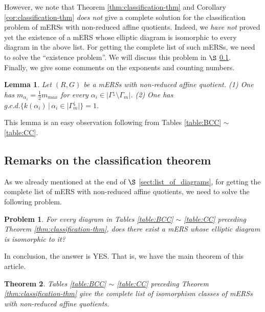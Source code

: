 \documentclass[11pt]{amsart}
\newtheorem{thm}{Theorem}[section]
\newtheorem{lemma}[thm]{Lemma}%
\newtheorem{prob}{Problem}
\begin{document}
{However, we note that Theorem \ref{thm:classification-thm} and 
Corollary \ref{cor:classification-thm} {\it does not}
give a complete solution for the 
classification problem of mERSs with non-reduced affine quotients. Indeed,  
we {\it have not} proved yet the existence of a mERS whose elliptic diagram
is isomorphic to every diagram in the above list. 
For getting the complete list of such mERSs, we need to solve the ``existence
problem''. We will discuss this problem in $\S$ \ref{sect_Remarks-classification}. \\

Finally, we give some comments on the exponents and
counting numbers. 
\begin{lemma}\label{lemma:observation-exponents}
Let $(R,G)$ be a mERSs with non-reduced affine quotient.
\vskip 1mm
\noindent
{\rm (1)} One has $m_{\alpha_i}=
\frac12 m_{max}$ for every $\alpha_i\in |\Gamma^{\downarrow}\setminus\Gamma_m|$.
\vskip 1mm
\noindent
{\rm (2)} One has $g.c.d.\{k(\alpha_i)\,|\,\alpha_i\in |\Gamma_m^\downarrow|\}=1$.
\end{lemma}
This lemma is an easy observation following from  %
Tables \ref{table:BCC} $\sim$ \ref{table:CC}. 
 
 



\subsection{Remarks on the classification theorem}
\label{sect_Remarks-classification}
As we already mentioned at the end of $\S$ \ref{sect:list_of_diagrams}, 
for getting the complete list of mERS with non-reduced affine quotients, 
we need to solve the following problem.
\begin{prob}\label{prob:existence}
For every diagram in Tables \ref{table:BCC} $\sim$ \ref{table:CC} 
preceding Theorem \ref{thm:classification-thm}, does there 
exist a mERS whose elliptic diagram is isomorphic to it?
\end{prob}
In conclusion, the answer is YES. 
That is, we have the main theorem of this article.
\begin{thm}\label{thm:main}
Tables \ref{table:BCC} $\sim$ \ref{table:CC} preceding Theorem 
\ref{thm:classification-thm}
give the complete list of isomorphism classes of mERSs with non-reduced affine 
quotients.
\end{thm}

}
\end{document}
